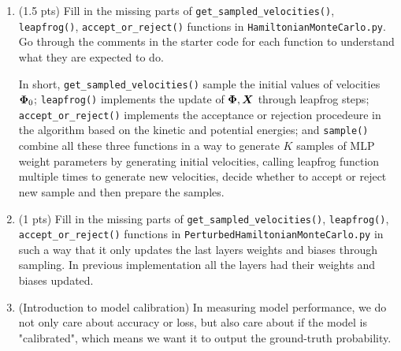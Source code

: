 \begin{enumerate}
%

   
\item
    (1.5 pts) Fill in the missing parts of \texttt{get\_sampled\_velocities()}, \texttt{leapfrog()}, \texttt{accept\_or\_reject()} functions in \texttt{HamiltonianMonteCarlo.py}. Go through the comments in the starter code for each function to understand what they are expected to do. 
    
    In short, \texttt{get\_sampled\_velocities()} sample the initial values of velocities $\bm{\Phi}_{0}$; \texttt{leapfrog()} implements the update of $\bm{\Phi}, \bm{X}$ through leapfrog steps; \texttt{accept\_or\_reject()} implements the acceptance or rejection procedeure in the algorithm based on the kinetic and potential energies; and \texttt{sample()} combine all these three functions in a way to generate $K$ samples of MLP weight parameters by generating initial velocities, calling leapfrog function multiple times to generate new velocities, decide whether to accept or reject new sample and then prepare the samples.    
    
\item (1 pts) Fill in the missing parts of \texttt{get\_sampled\_velocities()}, \texttt{leapfrog()}, \texttt{accept\_or\_reject()} functions in \texttt{PerturbedHamiltonianMonteCarlo.py} in such a way that it only updates the last layers weights and biases through sampling. In previous implementation all the layers had their weights and biases updated.

\item (Introduction to model calibration) In measuring model performance, we do not only care about accuracy or loss, but also care about if the model is "calibrated", which means we want it to output the ground-truth probability.


\end{enumerate}
